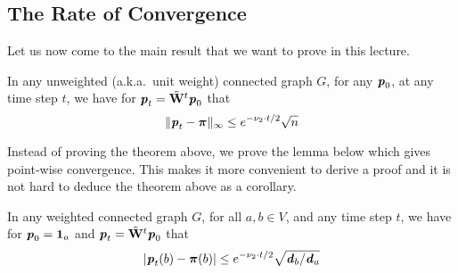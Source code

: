 \subsection{The Rate of Convergence}

Let us now come to the main result that we want to prove in this lecture. 

\begin{theorem}
In any unweighted (a.k.a.\ unit weight) connected graph $G$, for any $\boldsymbol{\mathit{p}}_0$, at any time step $t$, we have for $\boldsymbol{\mathit{p}}_t = {\tilde{\mathbf{W}}}^t \boldsymbol{\mathit{p}}_0$ that
\[
\| \boldsymbol{\mathit{p}}_t - \boldsymbol{\pi} \|_{\infty}  \leq e^{-\nu_2 \cdot t/2} \sqrt{n} 
\]
\end{theorem}

Instead of proving the theorem above, we prove the lemma below which gives point-wise convergence. This makes it more convenient to derive a proof and it is not hard to deduce the theorem above as a corollary.

\begin{lemma}
  In any weighted connected graph $G$, for all $a,b \in V$, and any time step $t$, we have for $\boldsymbol{\mathit{p}}_0 = \boldsymbol{1}_a$ and $\boldsymbol{\mathit{p}}_t = {\tilde{\mathbf{W}}}^t \boldsymbol{\mathit{p}}_0$ that
\[
  |\boldsymbol{\mathit{p}}_t(b) - \boldsymbol{\pi}(b)| \leq e^{-\nu_2 \cdot t/2} \sqrt{\boldsymbol{\mathit{d}}_b/\boldsymbol{\mathit{d}}_a} 
\]
\end{lemma}

